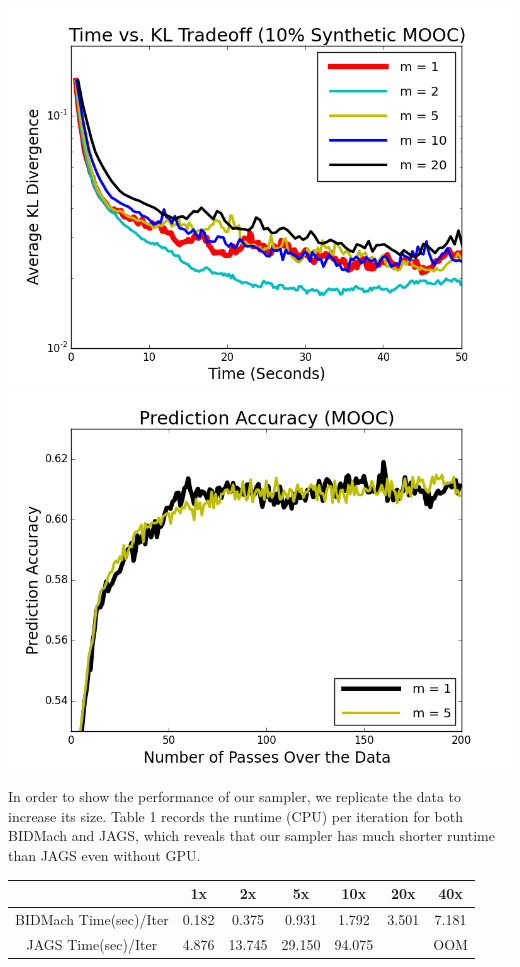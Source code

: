 \documentclass[a0paper,portrait]{baposter}
\begin{document}
\begin{poster}
{\begin{center}
\includegraphics[width=0.45\linewidth]{fig_kltime_tradeoff_mooc.png}
\includegraphics[width=0.45\linewidth]{fig_prediction_accuracy_mooc.png}
\end{center}




In order to show the performance of our sampler, we replicate the data to increase its size. Table 1 records the runtime (CPU) per iteration for both BIDMach and JAGS, which reveals that our sampler has much shorter runtime than JAGS even without GPU. 

\begin{center}
\begin{tabular}{ |c|c|c|c|c|c|c| } 
\hline
                  & 1x    & 2x    & 5x    & 10x   & 20x   & 40x   \\
\hline \hline
BIDMach Time(sec)/Iter & 0.182 & 0.375 & 0.931 & 1.792 & 3.501 & 7.181 \\ 
JAGS Time(sec)/Iter    & 4.876 & 13.745 & 29.150 & 94.075 & & OOM \\
\hline
\end{tabular}
\end{center}

}
\end{poster}
\end{document}
